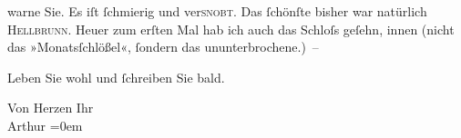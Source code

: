                warne Sie. Es iſt{ }ſchmierig und ver\textsc{snobt}. Das{ }ſchönſte
               bisher war natürlich \textsc{Hel\introOben{}l\introOben{}brunn}. Heuer zum erſten Mal hab ich auch das Schloſs geſehn, innen (nicht das »Monatsſchlößel«,{ }ſondern das ununterbrochene.) –\pend
           
\pstart
           Leben Sie wohl und{ }ſchreiben Sie bald.\pend
           
\pstart
           {\pb}Von Herzen Ihr{\\[\baselineskip]}\spacefill\mbox{Arthur}\pend
           \leftskip=0em{}\endnumbering{}  \newcommand{\dateiname}{L01140}\newcommand{\titel}{Arthur Schnitzler an Richard Beer-Hofmann, 4. 7. 1901}\newcommand{\editorInnen}{Martin Anton Müller und Gerd-Hermann Susen}
